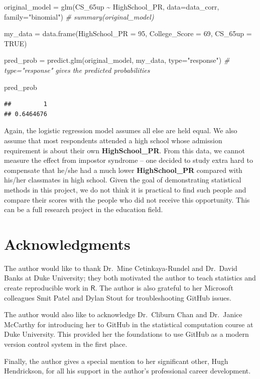 \documentclass[
]{article}
\newenvironment{Shaded}{\begin{snugshade}}{\end{snugshade}}
\newcommand{\AttributeTok}[1]{\textcolor[rgb]{0.77,0.63,0.00}{#1}}
\newcommand{\CommentTok}[1]{\textcolor[rgb]{0.56,0.35,0.01}{\textit{#1}}}
\newcommand{\ConstantTok}[1]{\textcolor[rgb]{0.00,0.00,0.00}{#1}}
\newcommand{\DecValTok}[1]{\textcolor[rgb]{0.00,0.00,0.81}{#1}}
\newcommand{\FunctionTok}[1]{\textcolor[rgb]{0.00,0.00,0.00}{#1}}
\newcommand{\NormalTok}[1]{#1}
\newcommand{\OtherTok}[1]{\textcolor[rgb]{0.56,0.35,0.01}{#1}}
\newcommand{\SpecialCharTok}[1]{\textcolor[rgb]{0.00,0.00,0.00}{#1}}
\newcommand{\StringTok}[1]{\textcolor[rgb]{0.31,0.60,0.02}{#1}}
\begin{document}
\begin{Shaded}
\begin{Highlighting}[]
\NormalTok{original\_model }\OtherTok{=} \FunctionTok{glm}\NormalTok{(CS\_65up }\SpecialCharTok{\textasciitilde{}}\NormalTok{ HighSchool\_PR, }\AttributeTok{data=}\NormalTok{data\_corr, }\AttributeTok{family=}\StringTok{"binomial"}\NormalTok{)}
\CommentTok{\# summary(original\_model)}

\NormalTok{my\_data }\OtherTok{=} \FunctionTok{data.frame}\NormalTok{(}\AttributeTok{HighSchool\_PR =} \DecValTok{95}\NormalTok{, }\AttributeTok{College\_Score =} \DecValTok{69}\NormalTok{, }\AttributeTok{CS\_65up =} \ConstantTok{TRUE}\NormalTok{)}

\NormalTok{pred\_prob }\OtherTok{=} \FunctionTok{predict.glm}\NormalTok{(original\_model, my\_data, }\AttributeTok{type=}\StringTok{"response"}\NormalTok{)}
\CommentTok{\# type="response" gives the predicted probabilities}

\NormalTok{pred\_prob}
\end{Highlighting}
\end{Shaded}

\begin{verbatim}
##         1 
## 0.6464676
\end{verbatim}

Again, the logistic regression model assumes all else are held equal. We
also assume that most respondents attended a high school whose admission
requirement is about their own \textbf{HighSchool\_PR}. From this data,
we cannot measure the effect from impostor syndrome -- one decided to
study extra hard to compensate that he/she had a much lower
\textbf{HighSchool\_PR} compared with his/her classmates in high school.
Given the goal of demonstrating statistical methods in this project, we
do not think it is practical to find such people and compare their
scores with the people who did not receive this opportunity. This can be
a full research project in the education field.

\hypertarget{acknowledgments}{%
\section*{Acknowledgments}\label{acknowledgments}}

The author would like to thank Dr.~Mine Cetinkaya-Rundel and Dr.~David
Banks at Duke University; they both motivated the author to teach
statistics and create reproducible work in \(\mathsf{R}\). The author is
also grateful to her Microsoft colleagues Smit Patel and Dylan Stout for
troubleshooting GitHub issues.

The author would also like to acknowledge Dr.~Cliburn Chan and
Dr.~Janice McCarthy for introducing her to GitHub in the statistical
computation course at Duke University. This provided her the foundations
to use GitHub as a modern version control system in the first place.

Finally, the author gives a special mention to her significant other,
Hugh Hendrickson, for all his support in the author's professional
career development.

\renewcommand\refname{References}
  
\end{document}
